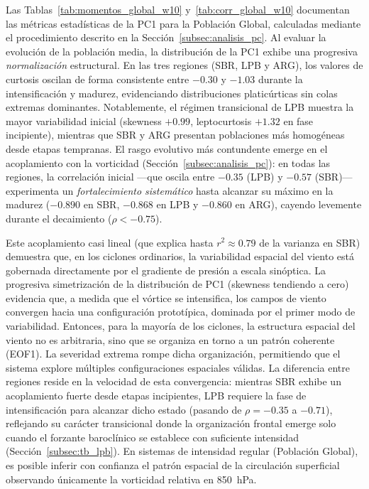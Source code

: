 Las Tablas~\ref{tab:momentos_global_w10} y~\ref{tab:corr_global_w10} documentan las métricas estadísticas de la PC1 para la Población Global, calculadas mediante el procedimiento descrito en la Sección~\ref{subsec:analisis_pc}. Al evaluar la evolución de la población media, la distribución de la PC1 exhibe una progresiva \textit{normalización} estructural. 
En las tres regiones (SBR, LPB y ARG), los valores de curtosis oscilan de forma consistente entre $-0.30$ y $-1.03$ durante la intensificación y madurez, evidenciando distribuciones platicúrticas sin colas extremas dominantes. 
Notablemente, el régimen transicional de LPB muestra la mayor variabilidad inicial (skewness $+0.99$, leptocurtosis $+1.32$ en fase incipiente), mientras que SBR y ARG presentan poblaciones más homogéneas desde etapas tempranas.
El rasgo evolutivo más contundente emerge en el acoplamiento con la vorticidad (Sección~\ref{subsec:analisis_pc}): en todas las regiones, la correlación inicial ---que oscila entre $-0.35$ (LPB) y $-0.57$ (SBR)--- experimenta un \textit{fortalecimiento sistemático} hasta alcanzar su máximo en la madurez ($-0.890$ en SBR, $-0.868$ en LPB y $-0.860$ en ARG), cayendo levemente durante el decaimiento ($\rho < -0.75$).



Este acoplamiento casi lineal (que explica hasta $r^2 \approx 0.79$ de la varianza en SBR) demuestra que, en los ciclones ordinarios, la variabilidad espacial del viento está gobernada directamente por el gradiente de presión a escala sinóptica. 
La progresiva simetrización de la distribución de PC1 (skewness tendiendo a cero) evidencia que, a medida que el vórtice se intensifica, los campos de viento convergen hacia una configuración prototípica, dominada por el primer modo de variabilidad. 
Entonces, para la mayoría de los ciclones, la estructura espacial del viento no es arbitraria, sino que se organiza en torno a un patrón coherente (EOF1). 
La severidad extrema rompe dicha organización, permitiendo que el sistema explore múltiples configuraciones espaciales válidas.
La diferencia entre regiones reside en la velocidad de esta convergencia: mientras SBR exhibe un acoplamiento fuerte desde etapas incipientes, LPB requiere la fase de intensificación para alcanzar dicho estado (pasando de $\rho = -0.35$ a $-0.71$), reflejando su carácter transicional donde la organización frontal emerge solo cuando el forzante baroclínico se establece con suficiente intensidad (Sección~\ref{subsec:tb_lpb}).
En sistemas de intensidad regular (Población Global), es posible inferir con confianza el patrón espacial de la circulación superficial observando únicamente la vorticidad relativa en 850~hPa.

